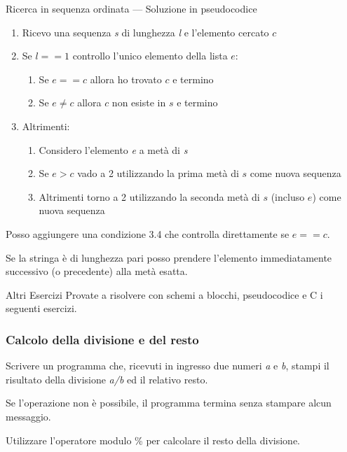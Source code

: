 \documentclass[aspectratio=169,]{beamer}
\begin{document}
\begin{frame}[allowframebreaks]{Ricerca in sequenza ordinata --- Soluzione in pseudocodice}
\begin{enumerate}
	\item Ricevo una sequenza \emph{s} di lunghezza \emph{l} e l'elemento cercato $c$
	\item Se $l == 1$ controllo l'unico elemento della lista $e$:
	\begin{enumerate}
		\item Se $e==c$ allora ho trovato $c$ e termino
		\item Se $e\neq c$ allora $c$ non esiste in $s$ e termino
	\end{enumerate}
	\item Altrimenti:
	\begin{enumerate}
		\item Considero l'elemento \emph{e} a metà di \emph{s}
		\item Se $e > c$ vado a 2 utilizzando la prima metà di $s$ come nuova sequenza
		\item Altrimenti torno a 2 utilizzando la seconda metà di $s$ (incluso $e$) come nuova sequenza
	\end{enumerate}
\end{enumerate}

Posso aggiungere una condizione 3.4 che controlla direttamente se $e == c$.

Se la stringa è di lunghezza pari posso prendere l'elemento immediatamente successivo (o precedente) alla metà esatta.
\end{frame}





\appendix
\begin{frame}{Altri Esercizi}
    Provate a risolvere con schemi a blocchi, pseudocodice e C i seguenti esercizi.
\end{frame}

\begin{frame}
	\frametitle{Calcolo della divisione e del resto}
	Scrivere un programma che, ricevuti in ingresso due numeri \emph{a} e \emph{b}, stampi il risultato della divisione \emph{a/b} ed il relativo resto.

	Se l'operazione non è possibile, il programma termina senza stampare alcun messaggio.

	Utilizzare l'operatore modulo \% per calcolare il resto della divisione.
\end{frame}
\end{document}
